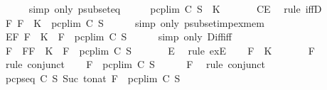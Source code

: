 \begin{isabellebody}
\ \ \ \ \isamarkupfalse%
\ {\isacharparenleft}simp\ only{\isacharcolon}\ psubset{\isacharunderscore}eq{\isacharparenright}\isanewline
\ \ \isamarkupfalse%
\ \isamarkupfalse%
\ {\isachardoublequoteopen}pcp{\isacharunderscore}lim\ C\ S\ {\isasymsubset}\ K{\isachardoublequoteclose}\ \isanewline
\ \ \ \ \isamarkupfalse%
\ CE\ \isamarkupfalse%
\ {\isacharparenleft}rule\ iffD{}{\isacharparenright}\isanewline
\ \ \isamarkupfalse%
\ \isamarkupfalse%
\ {\isachardoublequoteopen}{\isasymexists}F{\isachardot}\ F\ {\isasymin}\ {\isacharparenleft}K\ {\isacharminus}\ {\isacharparenleft}pcp{\isacharunderscore}lim\ C\ S{\isacharparenright}{\isacharparenright}{\isachardoublequoteclose}\isanewline
\ \ \ \ \isamarkupfalse%
\ {\isacharparenleft}simp\ only{\isacharcolon}\ psubset{\isacharunderscore}imp{\isacharunderscore}ex{\isacharunderscore}mem{\isacharparenright}\ \isanewline
\ \ \isamarkupfalse%
\ \isamarkupfalse%
\ E{\isacharcolon}{\isachardoublequoteopen}{\isasymexists}F{\isachardot}\ F\ {\isasymin}\ K\ {\isasymand}\ F\ {\isasymnotin}\ {\isacharparenleft}pcp{\isacharunderscore}lim\ C\ S{\isacharparenright}{\isachardoublequoteclose}\isanewline
\ \ \ \ \isamarkupfalse%
\ {\isacharparenleft}simp\ only{\isacharcolon}\ Diff{\isacharunderscore}iff{\isacharparenright}\isanewline
\ \ \isamarkupfalse%
\ F\ \ F{\isacharcolon}{\isachardoublequoteopen}F\ {\isasymin}\ K\ {\isasymand}\ F\ {\isasymnotin}\ pcp{\isacharunderscore}lim\ C\ S{\isachardoublequoteclose}\ \isanewline
\ \ \ \ \isamarkupfalse%
\ E\ \isamarkupfalse%
\ {\isacharparenleft}rule\ exE{\isacharparenright}\isanewline
\ \ \isamarkupfalse%
\ {\isachardoublequoteopen}F\ {\isasymin}\ K{\isachardoublequoteclose}\ \isanewline
\ \ \ \ \isamarkupfalse%
\ F\ \isamarkupfalse%
\ {\isacharparenleft}rule\ conjunct{}{\isacharparenright}\isanewline
\ \ \isamarkupfalse%
\ {\isachardoublequoteopen}F\ {\isasymnotin}\ pcp{\isacharunderscore}lim\ C\ S{\isachardoublequoteclose}\isanewline
\ \ \ \ \isamarkupfalse%
\ F\ \isamarkupfalse%
\ {\isacharparenleft}rule\ conjunct{}{\isacharparenright}\isanewline
\ \ \isamarkupfalse%
\ {\isachardoublequoteopen}pcp{\isacharunderscore}seq\ C\ S\ {\isacharparenleft}Suc\ {\isacharparenleft}to{\isacharunderscore}nat\ F{\isacharparenright}{\isacharparenright}\ {\isasymsubseteq}\ pcp{\isacharunderscore}lim\ C\ S{\isachardoublequoteclose}\isanewline

\end{isabellebody}
